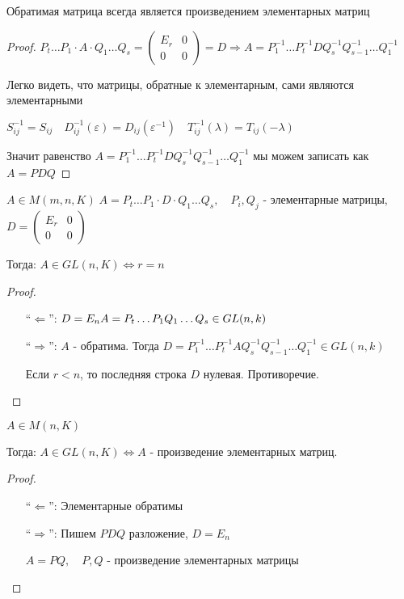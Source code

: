 \begin{theorem2}
    Обратимая матрица всегда является произведением элементарных матриц

    \begin{proof}
        $P_t \dots P_1 \cdot A \cdot Q_1 \dots Q_s = \begin{pmatrix}
            E_r & 0 \\
            0 & 0
        \end{pmatrix} = D \Longrightarrow A = P^{-1}_1 \dots P^{-1}_t D Q^{-1}_s Q^{-1}_{s-1} \dots Q^{-1}_{1}$

        Легко видеть, что матрицы, обратные к элементарным, сами являются элементарными

        $S^{-1}_{ij} = S_{ij} \quad D^{-1}_{ij}(\varepsilon) = D_{ij}(\varepsilon^{-1}) \quad T^{-1}_{ij}(\lambda) = T_{ij}(-\lambda)$

        Значит равенство $A = P^{-1}_1 \dots P^{-1}_t D Q^{-1}_s Q^{-1}_{s-1} \dots Q^{-1}_{1}$ мы можем записать 
        как $A = PDQ$
    \end{proof}
\end{theorem2}

\follow \; $A \in M(m, n, K) \; A = P_t \dots P_1 \cdot D \cdot Q_1 \dots Q_s, \quad P_i, Q_j $ - элементарные матрицы, $D = \begin{pmatrix}
    E_r & 0 \\
    0 & 0
\end{pmatrix}$

Тогда: $A \in GL(n, K) \Longleftrightarrow r = n$

\begin{proof} \quad

    \begin{itemize}
        \item[``$\Longleftarrow$'':] $D = E_n \\
            A = P_t \dots P_1 Q_1 \dots Q_s \in GL(n, k)$
        \item[``$\Longrightarrow$'':] $A$ - обратима. Тогда $D = P^{-1}_1 \dots P^{-1}_t A Q^{-1}_s Q^{-1}_{s-1} \dots Q^{-1}_{1} \in GL(n, k)$
            
            Если $r < n$, то последняя строка $D$ нулевая. Противоречие.
    \end{itemize}
\end{proof}

\follow \; $A \in M(n, K)$

Тогда: $A \in GL(n, K) \Longleftrightarrow A$ - произведение элементарных матриц.

\begin{proof} \quad

    \begin{itemize}
        \item[``$\Longleftarrow$'':] Элементарные обратимы
        \item[``$\Longrightarrow$'':] Пишем $PDQ$ разложение, $D = E_n$
        
        $A = PQ, \quad P, Q$ - произведение элементарных матрицы
    \end{itemize}
\end{proof}
